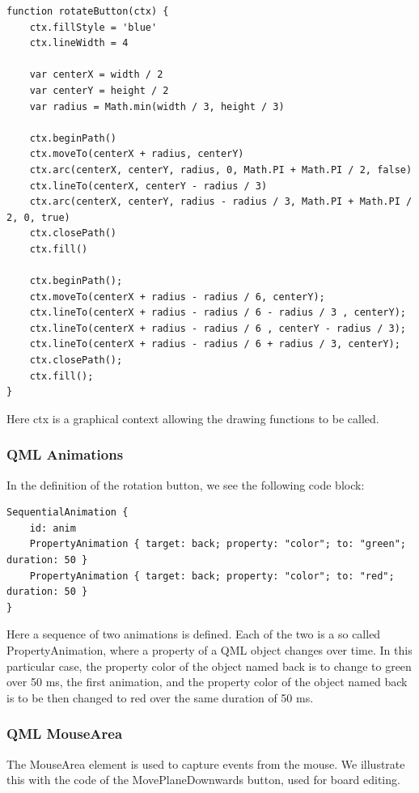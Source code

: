\begin{lstlisting}
function rotateButton(ctx) {
	ctx.fillStyle = 'blue'
	ctx.lineWidth = 4
	
	var centerX = width / 2
	var centerY = height / 2
	var radius = Math.min(width / 3, height / 3)
	
	ctx.beginPath()
	ctx.moveTo(centerX + radius, centerY)
	ctx.arc(centerX, centerY, radius, 0, Math.PI + Math.PI / 2, false)
	ctx.lineTo(centerX, centerY - radius / 3)
	ctx.arc(centerX, centerY, radius - radius / 3, Math.PI + Math.PI / 2, 0, true)
	ctx.closePath()
	ctx.fill()
	
	ctx.beginPath();
	ctx.moveTo(centerX + radius - radius / 6, centerY);
	ctx.lineTo(centerX + radius - radius / 6 - radius / 3 , centerY);
	ctx.lineTo(centerX + radius - radius / 6 , centerY - radius / 3);
	ctx.lineTo(centerX + radius - radius / 6 + radius / 3, centerY);
	ctx.closePath();
	ctx.fill();
}
\end{lstlisting}

Here ctx is a graphical context allowing the drawing functions to be called.


\subsubsection {QML Animations} \label{qml:animation}

In the definition of the rotation button, we see the following code block:

\begin{lstlisting}
SequentialAnimation {
	id: anim
	PropertyAnimation { target: back; property: "color"; to: "green"; duration: 50 }
	PropertyAnimation { target: back; property: "color"; to: "red"; duration: 50 }
}
\end{lstlisting}

Here a sequence of two animations is defined. Each of the two is a so called PropertyAnimation, where a property of a QML object changes over time. In this particular case, the property color of the object named back is to change to green over 50 ms, the first animation, and the property color of the object named back is to be then changed to red over the same duration of 50 ms.



\subsubsection {QML MouseArea} \label{qml:mouse_area}

The MouseArea element is used to capture events from the mouse. We illustrate this with the code of the MovePlaneDownwards button, used for board editing.


